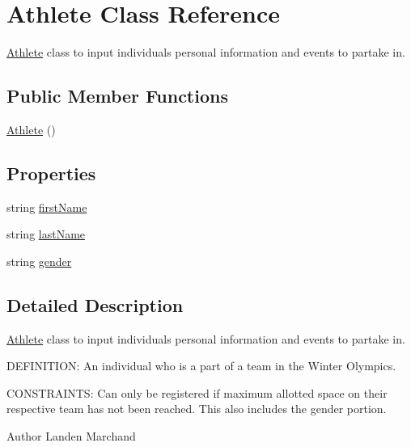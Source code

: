 \hypertarget{classAthlete}{}\section{Athlete Class Reference}
\label{classAthlete}


\hyperlink{classAthlete}{Athlete} class to input individual\textquotesingle{}s personal information and events to partake in.  


\subsection*{Public Member Functions}
\begin{DoxyCompactItemize}
\item 
\hyperlink{classAthlete_a3b2ab137b0f940eee2965898bd22dadb}{Athlete} ()
\end{DoxyCompactItemize}
\subsection*{Properties}
\begin{DoxyCompactItemize}
\item 
string \hyperlink{classAthlete_af1567abd99a20dd128959681ef7f457b}{first\+Name}
\item 
string \hyperlink{classAthlete_a9d8f08579c9749c7f40965a100fc8b08}{last\+Name}
\item 
string \hyperlink{classAthlete_a6606f4bf491738676ed79d3680bbe1b2}{gender}
\end{DoxyCompactItemize}


\subsection{Detailed Description}
\hyperlink{classAthlete}{Athlete} class to input individual\textquotesingle{}s personal information and events to partake in. 

D\+E\+F\+I\+N\+I\+T\+I\+ON\+: An individual who is a part of a team in the Winter Olympics.

C\+O\+N\+S\+T\+R\+A\+I\+N\+TS\+: Can only be registered if maximum allotted space on their respective team has not been reached. This also includes the gender portion.\begin{DoxyAuthor}{Author}
Landen Marchand 
\end{DoxyAuthor}



